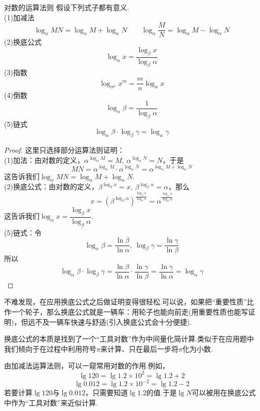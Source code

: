\documentclass[lang=cn, zihao=5]{elegantbook}
\begin{document}
\begin{proposition}{对数的运算法则}
	假设下列式子都有意义. \\
	(1)加减法$$\log_{\alpha}{MN} = \log_{\alpha}{M} + \log_{\alpha}{N} \qquad \log_{\alpha}{\frac{M}{N}} = \log_{\alpha}{M} - \log_{\alpha}{N}$$
	(2)换底公式$$\log_{\alpha}{x} = \frac{\log_{\beta}{x}}{\log_{\beta}{\alpha}}$$
	(3)指数$$\log_{\alpha ^n}{x^m} = \frac{m}{n} \log_{\alpha}{x}$$
	(4)倒数$$\log_{\alpha}{\beta} = \frac{1}{\log_{\beta}{\alpha}}$$
	(5)链式$$\log_{\alpha}{\beta} \cdot \log_{\beta}{\gamma} = \log_{\alpha}{\gamma}$$
\end{proposition}
\begin{proof}
	这里只选择部分运算法则证明： \\
	(1)加法：由对数的定义，$\alpha ^{\log_{\alpha}{M}} = M,~\alpha ^{\log_{\alpha}{N}} = N$，于是$$MN = \alpha ^{\log_{\alpha}{M}} \cdot \alpha ^{\log_{\alpha}{N}} = \alpha ^{\log_{\alpha}{M} + \log_{\alpha}{N}}$$
	这告诉我们$\log_{\alpha}{MN} = \log_{\alpha}{M} + \log_{\alpha}{N}$. \\
	(2)换底公式：由对数的定义，$\beta ^{\log_{\beta}{x}} = x,~\beta ^{\log_{\beta}{\alpha}} = \alpha$，那么$$x = (\beta ^{\log_{\beta}{\alpha}})^{\frac{\log_{\beta}{x}}{\log_{\beta}{\alpha}}} = \alpha ^{\frac{\log_{\beta}{x}}{\log_{\beta}{\alpha}}}$$
	这告诉我们$\log_{\alpha}{x} = \dfrac{\log_{\beta}{x}}{\log_{\beta}{\alpha}}$. \\
	(5)链式：令$$\log_{\alpha}{\beta} = \frac{\ln{\beta}}{\ln{\alpha}},~ \log_{\beta}{\gamma} = \frac{\ln{\gamma}}{\ln{\beta}}$$
	所以$$\log_{\alpha}{\beta} \cdot \log_{\beta}{\gamma} = \frac{\ln{\beta}}{\ln{\alpha}} \cdot \frac{\ln{\gamma}}{\ln{\beta}} = \frac{\ln{\gamma}}{\ln{\alpha}} = \log_{\alpha}{\gamma}$$
\end{proof}
\begin{remark}
	不难发现，在应用换底公式之后做证明变得很轻松.可以说，如果把“重要性质”比作一个轮子，那么换底公式就是一辆车：用轮子也能向前走(用重要性质也能写证明)，但远不及一辆车快速与舒适(引入换底公式会十分便捷).
\end{remark}
\begin{remark}
	换底公式的本质是找到了一个“工具对数”作为中间量化简计算.类似于在应用题中我们倾向于在过程中利用符号$\pi $来计算、只在最后一步将$\pi $化为小数.
\end{remark}
\begin{remark}
	由加减法运算法则，可以一窥常用对数的作用.例如，
	$$\lg{120} = \lg{1.2 \times 10^2} = \lg{1.2}+2$$
	$$\lg{0.012} = \lg{1.2 \times 10^{-2}} = \lg{1.2}-2$$
	若要计算$\lg{120}$与$\lg{0.012}$，只需要知道$\lg{1.2}$的值.于是$\lg{N}$可以被用在换底公式中作为“工具对数”来近似计算.
\end{remark}
\end{document}
